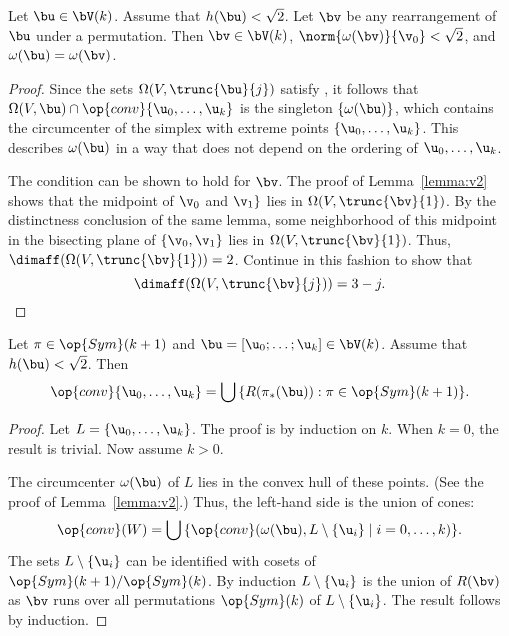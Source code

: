 \begin{lemma}   
Let $\bu\in \bV(k)$.  Assume that $h(\bu)<\sqrt2$. Let $\bv$ be any
rearrangement of $\bu$ under a permutation.  Then $\bv\in \bV(k)$,
$\norm{\omega(\bv)}{\v_0}<\sqrt2$, and $\omega(\bu) = \omega(\bv)$.
\end{lemma}

\begin{proof} 
Since the sets $\Omega(V,\trunc{\bu}{j})$ satisfy , it
follows that $\Omega(V,\bu)\cap \op{conv}\{ \u_0,\ldots, \u_k\}$ is
the singleton $\{\omega(\bu)\}$, which contains the circumcenter of
the simplex with extreme points $\{ \u_0,\ldots, \u_k\}$.  This describes
$\omega(\bu)$ in a way that does not depend on the ordering of $
\u_0,\ldots, \u_k$.

The condition  can be shown to hold for $\bv$.
The proof of Lemma~\ref{lemma:v2} shows that the midpoint of $\v_0$
and $\v_1\}$ lies in $\Omega(V,\trunc{\bv}{1})$.  By the distinctness
conclusion of the same lemma, some neighborhood of this midpoint in
the bisecting plane of $\{\v_0,\v_1\}$ lies in $\Omega(V,\trunc{\bv}{1})$.
Thus, $\dimaff(\Omega(V,\trunc{\bv}{1}))=2$.  Continue in this fashion to show
that
\begin{displaymath}
\dimaff(\Omega(V,\trunc{\bv}{j}))=3-j.\end{displaymath}
\end{proof}

\begin{lemma}\label{lemma:Rconv}  Let $\pi\in\op{Sym}(k+1)$
and $\bu = [\u_0;\ldots;\u_k]\in \bV(k)$.  Assume that
$h(\bu)<\sqrt2$. Then
\begin{displaymath}
\op{conv}\{ \u_0,\ldots, \u_k\} = \bigcup \,\{ R(\pi_*(\bu)) : \pi\in \op{Sym}(k+1)\}.
\end{displaymath}
\end{lemma}
%

\begin{proof} Let $L = \{ \u_0,\ldots, \u_k\}$.  The proof is by
induction on $k$.  When $k=0$, the result is trivial.  Now assume
$k>0$.

The circumcenter $\omega(\bu)$ of $L$ lies in the convex hull of
these points.  (See the proof of Lemma~\ref{lemma:v2}.)  Thus, the
left-hand side is the union of cones:
\begin{displaymath}
\op{conv}(W) = \bigcup\,\{ \op{conv}(\omega(\bu),L\setminus \{ \u_i\}\mid i=0,\ldots,k) \}.
\end{displaymath}
The sets $L\setminus \{ \u_i\}$ can be identified with cosets of
$\op{Sym}(k+1) /\op{Sym}(k)$.  By induction $L\setminus \{ \u_i\}$ is
the union of $R(\bv)$ as $\bv$ runs over all permutations
$\op{Sym}(k)$ of $L\setminus \{ \u_i\}$.  The result follows by
induction.
\end{proof}

